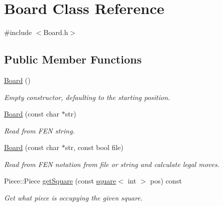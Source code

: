 \hypertarget{classBoard}{}\section{Board Class Reference}
\label{classBoard}


{\ttfamily \#include $<$Board.\+h$>$}

\subsection*{Public Member Functions}
\begin{DoxyCompactItemize}
\item 
\mbox{\label{classBoard_a9ee491d4fea680cf69b033374a9fdfcb}} 
\hyperlink{classBoard_a9ee491d4fea680cf69b033374a9fdfcb}{Board} ()
\begin{DoxyCompactList}\small\item\em Empty constructor, defaulting to the starting position. \end{DoxyCompactList}\item 
\mbox{\label{classBoard_a155259ecd3131cbf8c155c1dd19026b0}} 
\hyperlink{classBoard_a155259ecd3131cbf8c155c1dd19026b0}{Board} (const char $\ast$str)
\begin{DoxyCompactList}\small\item\em Read from F\+EN string. \end{DoxyCompactList}\item 
\hyperlink{classBoard_a8dd2a85d6b43bcab4eaf83e1541aeb18}{Board} (const char $\ast$str, const bool file)
\begin{DoxyCompactList}\small\item\em Read from F\+EN notation from file or string and calculate legal moves. \end{DoxyCompactList}\item 
\mbox{\label{classBoard_a8359f43f59d4eb04c679f0415c26add4}} 
Piece\+::\+Piece \hyperlink{classBoard_a8359f43f59d4eb04c679f0415c26add4}{get\+Square} (const \hyperlink{structsquare}{square}$<$ int $>$ pos) const
\begin{DoxyCompactList}\small\item\em Get what piece is occupying the given square. \end{DoxyCompactList}\item 
\mbox{\label{classBoard_a58ee677360099107d0d33becdc2af888}} 

\end{DoxyCompactItemize}
